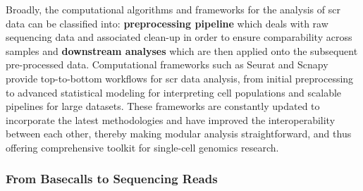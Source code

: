 \par Broadly, the computational algorithms and frameworks for the analysis of \gls{scr} data can be classified into: \textbf{preprocessing pipeline} which deals with raw sequencing data and associated clean-up in order to ensure comparability across samples and \textbf{downstream analyses} which are then applied onto the subsequent pre-processed data. Computational frameworks such as Seurat \textbf{\cite{butler_integrating_2018,stuart_comprehensive_2019,hao_integrated_2021}} and Scnapy \textbf{\cite{wolf_scanpy_2018}} provide top-to-bottom workflows for \gls{scr} data analysis, from initial preprocessing to advanced statistical modeling for interpreting cell populations and scalable pipelines for large datasets. These frameworks are constantly updated to incorporate the latest methodologies and have improved the interoperability between each other, thereby making modular analysis straightforward, and thus offering comprehensive toolkit for single-cell genomics research. 

\subsubsection{From Basecalls to Sequencing Reads}



